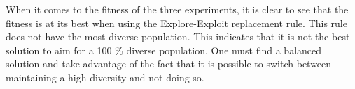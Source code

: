 When it comes to the fitness of the three experiments, it is clear to see that the fitness is at its best when using the Explore-Exploit replacement rule. This rule does not have the most diverse population. This indicates that it is not the best solution to aim for a 100 \% diverse population. One must find a balanced solution and take advantage of the fact that it is possible to switch between maintaining a high diversity and not doing so.

